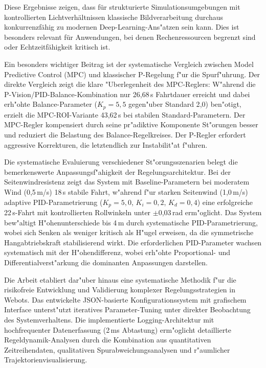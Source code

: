 Diese Ergebnisse zeigen, dass für strukturierte Simulationsumgebungen mit kontrollierten Lichtverhältnissen klassische 
Bildverarbeitung durchaus konkurrenzfähig zu modernen Deep-Learning-Ans{"a}tzen sein kann. Dies ist besonders relevant 
für Anwendungen, bei denen Rechenressourcen begrenzt sind oder Echtzeitfähigkeit kritisch ist.

Ein besonders wichtiger Beitrag ist der systematische Vergleich zwischen Model Predictive Control (MPC) und 
klassischer P-Regelung f{"u}r die Spurf{"u}hrung. Der direkte Vergleich zeigt die klare {"U}berlegenheit des MPC-Reglers: 
W{"a}hrend die P-Vision/PID-Balance-Kombination nur 26{,}68\,s Fahrtdauer erreicht und dabei erh{"o}hte Balance-Parameter 
($K_p = 5{,}5$ gegen{"u}ber Standard 2{,}0) ben{"o}tigt, erzielt die MPC-ROI-Variante 43{,}62\,s bei stabilen Standard-Parametern. 
Der MPC-Regler kompensiert durch seine pr{"a}diktive Komponente St{"o}rungen besser und reduziert die Belastung des 
Balance-Regelkreises. Der P-Regler erfordert aggressive Korrekturen, die letztendlich zur Instabilit{"a}t f{"u}hren.

Die systematische Evaluierung verschiedener St{"o}rungsszenarien belegt die bemerkenswerte Anpassungsf{"a}higkeit der 
Regelungsarchitektur. Bei der Seitenwindresistenz zeigt das System mit Baseline-Parametern bei moderatem Wind 
(0,5\,m/s) 18\,s stabile Fahrt, w{"a}hrend f{"u}r starken Seitenwind (1,0\,m/s) adaptive PID-Parametrierung 
($K_p=5{,}0$, $K_i=0{,}2$, $K_d=0{,}4$) eine erfolgreiche 22\,s-Fahrt mit kontrollierten Rollwinkeln unter $\pm$0,03\,rad erm{"o}glicht. 
Das System bew{"a}ltigt H{"o}henunterschiede bis 4\,m durch systematische PID-Parametrierung, wobei sich Senken als weniger 
kritisch als H{"u}gel erweisen, da die symmetrische Hangabtriebskraft stabilisierend wirkt. Die erforderlichen PID-Parameter 
wachsen systematisch mit der H{"o}hendifferenz, wobei erh{"o}hte Proportional- und Differentialverst{"a}rkung die dominanten 
Anpassungen darstellen.

Die Arbeit etabliert dar{"u}ber hinaus eine systematische Methodik f{"u}r die risikofreie Entwicklung und Validierung komplexer 
Regelungsstrategien in Webots. Das entwickelte JSON-basierte Konfigurationssystem mit grafischem Interface unterst{"u}tzt 
iteratives Parameter-Tuning unter direkter Beobachtung des Systemverhaltens. Die implementierte Logging-Architektur mit 
hochfrequenter Datenerfassung (2\,ms Abtastung) erm{"o}glicht detaillierte Regeldynamik-Analysen durch die Kombination aus 
quantitativen Zeitreihendaten, qualitativen Spurabweichungsanalysen und r{"a}umlicher Trajektorienvisualisierung.

